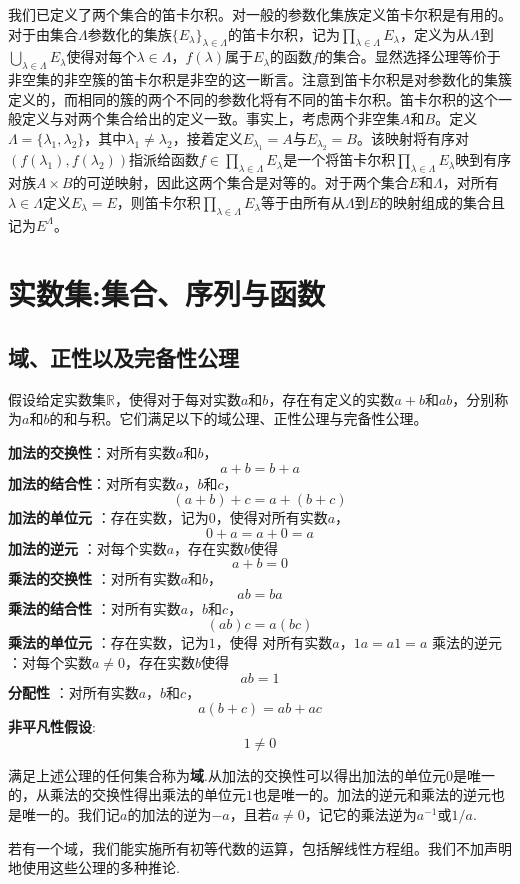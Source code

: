 \documentclass[lang=cn,newtx,10pt,scheme=chinese]{elegantbook}
\begin{document}
我们已定义了两个集合的笛卡尔积。对一般的参数化集族定义笛卡尔积是有用的。对于由集合\(\Lambda\)参数化的集族\(\{E_{\lambda}\}_{\lambda\in\Lambda}\)的笛卡尔积，记为\(\prod_{\lambda\in\Lambda}E_{\lambda}\)，定义为从\(\Lambda\)到\(\bigcup_{\lambda\in\Lambda}E_{\lambda}\)使得对每个\(\lambda\in\Lambda\)，\(f(\lambda)\)属于\(E_{\lambda}\)的函数\(f\)的集合。显然选择公理等价于非空集的非空簇的笛卡尔积是非空的这一断言。注意到笛卡尔积是对参数化的集簇定义的，而相同的簇的两个不同的参数化将有不同的笛卡尔积。笛卡尔积的这个一般定义与对两个集合给出的定义一致。事实上，考虑两个非空集\(A\)和\(B\)。定义\(\Lambda=\{\lambda_1,\lambda_2\}\)，其中\(\lambda_1\neq\lambda_2\)，接着定义\(E_{\lambda_1}=A\)与\(E_{\lambda_2}=B\)。该映射将有序对\((f(\lambda_1),f(\lambda_2))\)指派给函数\(f\in\prod_{\lambda\in\Lambda}E_{\lambda}\)是一个将笛卡尔积\(\prod_{\lambda\in\Lambda}E_{\lambda}\)映到有序对族\(A\times B\)的可逆映射，因此这两个集合是对等的。对于两个集合\(E\)和\(\Lambda\)，对所有\(\lambda\in\Lambda\)定义\(E_{\lambda}=E\)，则笛卡尔积\(\prod_{\lambda\in\Lambda}E_{\lambda}\)等于由所有从\(\Lambda\)到\(E\)的映射组成的集合且记为\(E^{\Lambda}\)。







\chapter{实数集:集合、序列与函数}

\section{域、正性以及完备性公理}

假设给定实数集\(\mathbb{R}\)，使得对于每对实数\(a\)和\(b\)，存在有定义的实数\(a + b\)和\(ab\)，分别称为\(a\)和\(b\)的和与积。它们满足以下的域公理、正性公理与完备性公理。

\begin{axiom}[域公理]\label{axiom:域公理}
  \textbf{加法的交换性}：对所有实数\(a\)和\(b\)，
\[a + b = b + a\]
\textbf{加法的结合性}：对所有实数\(a\)，\(b\)和\(c\)，
\[(a + b)+c = a+(b + c)\]
\textbf{加法的单位元} ：存在实数，记为\(0\)，使得对所有实数\(a\)，
\[0 + a = a + 0 = a\]
\textbf{加法的逆元} ：对每个实数\(a\)，存在实数\(b\)使得
\[a + b = 0\]
\textbf{乘法的交换性} ：对所有实数\(a\)和\(b\)，
\[ab = ba\]
\textbf{乘法的结合性} ：对所有实数\(a\)，\(b\)和\(c\)，
\[(ab)c = a(bc)\]
\textbf{乘法的单位元} ：存在实数，记为\(1\)，使得
对所有实数\(a\)，\(1a = a1 = a\)
 乘法的逆元 ：对每个实数\(a\neq0\)，存在实数\(b\)使得
\[ab = 1\]
\textbf{分配性} ：对所有实数\(a\)，\(b\)和\(c\)，
\[a(b + c)=ab + ac\]
\textbf{非平凡性假设}:
\[1\neq0\]

满足上述公理的任何集合称为\textbf{域}.从加法的交换性可以得出加法的单位元\(0\)是唯一的，从乘法的交换性得出乘法的单位元\(1\)也是唯一的。加法的逆元和乘法的逆元也是唯一的。我们记\(a\)的加法的逆为\(-a\)，且若\(a\neq0\)，记它的乘法逆为\(a^{-1}\)或\(1/a\).
\end{axiom}
\begin{remark}
  若有一个域，我们能实施所有初等代数的运算，包括解线性方程组。我们不加声明地使用这些公理的多种推论.
\end{remark}
\end{document}
